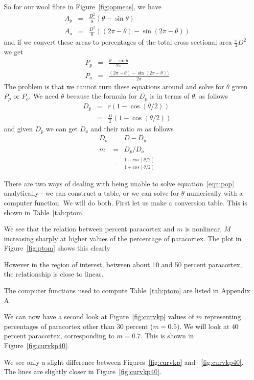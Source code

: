\documentclass[titlepage]{article}  %
\begin{document}
So for our wool fibre in Figure~\ref{fig:opmeas}, we have
\begin{eqnarray*}
A_{p} & = & \frac{D^{2}}{8} ( \theta - \sin \theta) \\
A_{o} & = & \frac{D^{2}}{8} ( (2 \pi -\theta) - \sin (2 \pi - \theta)) 
\end{eqnarray*}
and if we convert these areas to percentages of the total cross sectional area $\frac{\pi}{4}D^{2}$ we get 
\begin{eqnarray}
\label{eqn:pop}
P_{p} & = &  \frac{ \theta - \sin \theta}{2  \pi} \\
P_{o} & = & \frac{ (2 \pi -\theta) - \sin (2 \pi - \theta))} {2  \pi}
\end{eqnarray}
The problem is that we cannot turn these equations around and solve for $\theta$ given $P_{p}$ or $P_{o}$.  We need $\theta$ because the formula for $D_{p}$ is in terms of $\theta$, as follows
\begin{eqnarray*}
D_{p} & = & r ( 1 - \cos (\theta/2)) \\
      & = & \frac{D}{2} ( 1 - \cos (\theta/2))
\end{eqnarray*}
and given $D_{p}$ we can get $D_{o}$ and their ratio $m$ as follows
\begin{eqnarray*}
D_{o} & = &  D - D_{p} \\
m     & = & D_{p} / D_{o} \\
      & = & \frac{1-cos(\theta/2)}{1 + cos(\theta/2)}
\end{eqnarray*}

There are two ways of dealing with being unable to solve equation~\ref{eqn:pop} analytically - we can construct a table, or we can solve for $\theta$ numerically with a computer function. We will do both.  First let us make a conversion table. This is shown in Table~\ref{tab:ptom}

We see that the relation between percent paracortex and $m$ is nonlinear, $M$ increasing sharply at higher values of the percentage of paracortex. The plot in Figure~\ref{fig:ptom} shows this clearly

However in the region of interest, between about 10 and 50 percent paracortex, the relationship is close to linear.

The computer functions used to compute Table~\ref{tab:ptom} are listed in Appendix A.

We can now have a second look at Figure~\ref{fig:curvkp}  values of $m$ representing percentages of paracortex other than 30 percent ($m = 0.5$). We will look at 40 percent paracortex, corresponding to $m = 0.7$. This is shown in Figure~\ref{fig:curvkp40}.

We see only a slight difference between Figures~\ref{fig:curvkp}  and ~\ref{fig:curvkp40}. The lines are slightly closer in Figure~\ref{fig:curvkp40}.
\end{document}
